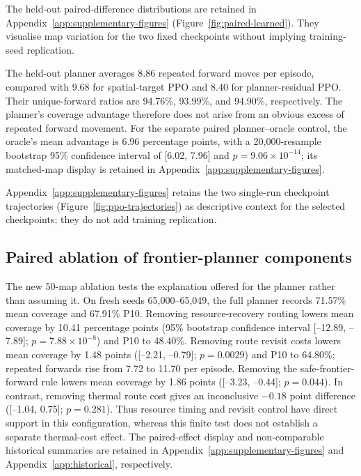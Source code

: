 \documentclass[10pt,letterpaper]{article}
\begin{document}
The held-out paired-difference distributions are retained in Appendix~\ref{app:supplementary-figures} (Figure~\ref{fig:paired-learned}). They visualise map variation for the two fixed checkpoints without implying training-seed replication.

The held-out planner averages 8.86 repeated forward moves per episode, compared with 9.68 for spatial-target PPO and 8.40 for planner-residual PPO. Their unique-forward ratios are 94.76\%, 93.99\%, and 94.90\%, respectively. The planner's coverage advantage therefore does not arise from an obvious excess of repeated forward movement. For the separate paired planner--oracle control, the oracle's mean advantage is 6.96 percentage points, with a 20,000-resample bootstrap 95\% confidence interval of [6.02, 7.96] and $p=9.06\times10^{-14}$; its matched-map display is retained in Appendix~\ref{app:supplementary-figures}.

Appendix~\ref{app:supplementary-figures} retains the two single-run checkpoint trajectories (Figure~\ref{fig:ppo-trajectories}) as descriptive context for the selected checkpoints; they do not add training replication.

\subsection{Paired ablation of frontier-planner components}

The new 50-map ablation tests the explanation offered for the planner rather than assuming it. On fresh seeds 65,000--65,049, the full planner records 71.57\% mean coverage and 67.91\% P10. Removing resource-recovery routing lowers mean coverage by 10.41 percentage points (95\% bootstrap confidence interval [--12.89, --7.89]; $p=7.88\times10^{-8}$) and P10 to 48.40\%. Removing route revisit costs lowers mean coverage by 1.48 points ([--2.21, --0.79]; $p=0.0029$) and P10 to 64.80\%; repeated forwards rise from 7.72 to 11.70 per episode. Removing the safe-frontier-forward rule lowers mean coverage by 1.86 points ([--3.23, --0.44]; $p=0.044$). In contrast, removing thermal route cost gives an inconclusive $-0.18$ point difference ([--1.04, 0.75]; $p=0.281$). Thus resource timing and revisit control have direct support in this configuration, whereas this finite test does not establish a separate thermal-cost effect. The paired-effect display and non-comparable historical summaries are retained in Appendix~\ref{app:supplementary-figures} and Appendix~\ref{app:historical}, respectively.
\end{document}
